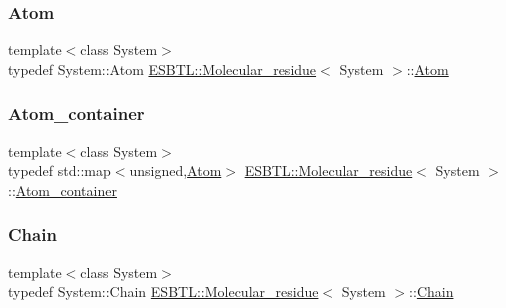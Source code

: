 \subsubsection{\texorpdfstring{Atom}{Atom}}
{\footnotesize\ttfamily template$<$class System$>$ \\
typedef System\+::\+Atom \hyperlink{classESBTL_1_1Molecular__residue}{E\+S\+B\+T\+L\+::\+Molecular\+\_\+residue}$<$ System $>$\+::\hyperlink{classESBTL_1_1Molecular__residue_ac48ca38f130266b0403df294bff016ae}{Atom}}

\mbox{\label{classESBTL_1_1Molecular__residue_af354df2c3267d075215464cd408b8d78}} 
\subsubsection{\texorpdfstring{Atom\+\_\+container}{Atom\_container}}
{\footnotesize\ttfamily template$<$class System$>$ \\
typedef std\+::map$<$unsigned,\hyperlink{classESBTL_1_1Molecular__residue_ac48ca38f130266b0403df294bff016ae}{Atom}$>$ \hyperlink{classESBTL_1_1Molecular__residue}{E\+S\+B\+T\+L\+::\+Molecular\+\_\+residue}$<$ System $>$\+::\hyperlink{classESBTL_1_1Molecular__residue_af354df2c3267d075215464cd408b8d78}{Atom\+\_\+container}}

\mbox{\label{classESBTL_1_1Molecular__residue_a3e18b15e0505f8b1c0d0bf200091698d}} 
\subsubsection{\texorpdfstring{Chain}{Chain}}
{\footnotesize\ttfamily template$<$class System$>$ \\
typedef System\+::\+Chain \hyperlink{classESBTL_1_1Molecular__residue}{E\+S\+B\+T\+L\+::\+Molecular\+\_\+residue}$<$ System $>$\+::\hyperlink{classESBTL_1_1Molecular__residue_a3e18b15e0505f8b1c0d0bf200091698d}{Chain}}



